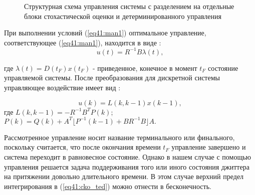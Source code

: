 \begin{figure}[!h]

\centering
{} 
\caption{Структурная схема управления системы с разделением на отдельные блоки стохастической оценки и детерминированного управления}
\label{fig:man_stat}
\end{figure}

При выполнении условий (\ref{eq41:man1}) оптимальное управление, соответствующее (\ref{eq41:man1}), находится в виде \cite{popovski}:
\begin{equation}\label{eq41:man2}
u(t)=R^{-1}B\lambda(t),
\end{equation}

\noindent где $\lambda (t)=D(t_F)x(t_F)$ - приведенное, конечное в момент $t_F$ состояние управляемой системы.
После преобразования для дискретной системы управляющее воздействие имеет вид \cite{popovski}:

\begin{equation}\label{eq41:man3}
u(k)=L(k,k-1)x(k-1),
\end{equation}
\noindent где $L(k,k-1)=-R^{-1}B^TP(k)$; $P(k)=Q(k)+A^T\lfloor P^{-1}(k-1)+BR^{-1}B\rfloor A.$

Рассмотренное управление носит название терминального или финального, поскольку считается, что после окончания времени $t_F$ управление завершено и система переходит в равновесное состояние.
Однако в нашем случае с помощью управления решается задача поддерживания того или иного состояния джиттера на притяжении довольно длительного времени. 
В этом случае верхний предел интегрирования в (\ref{eq41:cko_ted}) можно отнести в бесконечность.

